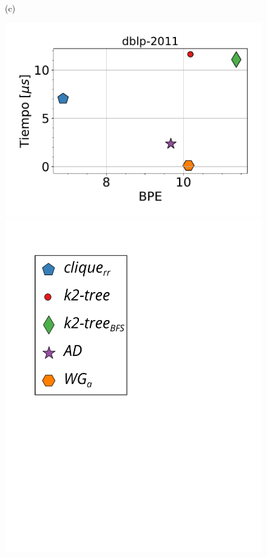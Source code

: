 \begin{figure}
\begin{minipage}{1\textwidth}
\begin{minipage}{0.45\textwidth}
    			(c)
    		\end{minipage}
    		\begin{minipage}{0.45\textwidth}
    			\centering
    			\begin{minipage}{0.75\textwidth}
    				\centering
    				\includegraphics[width=1\linewidth]{img/bpeTimes/aleatorio/dblp-2011.pdf}
    			\end{minipage}
    			\begin{minipage}{0.2\textwidth}
    				\centering
    				\includegraphics[scale=.2, clip, trim=60 194 0 0]{img/bpeTimes/labelAle.pdf}
    			\end{minipage}
    			

\end{minipage}
\end{minipage}
\end{figure}
